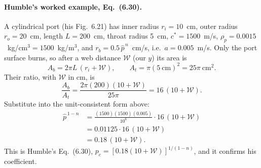 \paragraph{Humble's worked example, Eq.~(6.30).} A cylindrical port
(his Fig.~6.21) has inner radius $r_i=10$~cm, outer radius
$r_o=20$~cm, length $L=200$~cm, throat radius 5~cm,
$c^*=1500$~m/s, $\rho_p=0.0015$~kg/cm$^3=1500$~kg/m$^3$, and
$r_b=0.5\,\hat p^{\,n}$~cm/s, i.e.\ $a=0.005$~m/s. Only the port surface
burns, so after a web distance $\mathcal W$ (our $y$) its area is
\[
 A_b=2\pi L\,(r_i+\mathcal W),\qquad
 A_t=\pi(5\ \mathrm{cm})^2=25\pi\ \mathrm{cm}^2.
\]
Their ratio, with $\mathcal W$ in cm, is
\[
 \frac{A_b}{A_t}
 =\frac{2\pi(200)(10+\mathcal W)}{25\pi}
 =16\,(10+\mathcal W).
\]
Substitute into the unit-consistent form above:
\begin{align*}
 \hat p^{\,1-n}
 &=\frac{(1500)(1500)(0.005)}{10^6}\cdot16\,(10+\mathcal W)\\
 &=0.01125\cdot16\,(10+\mathcal W)\\
 &=0.18\,(10+\mathcal W).
\end{align*}
This is Humble's Eq.~(6.30),
$p_c=[0.18(10+\mathcal W)]^{1/(1-n)}$, and it confirms his coefficient.

